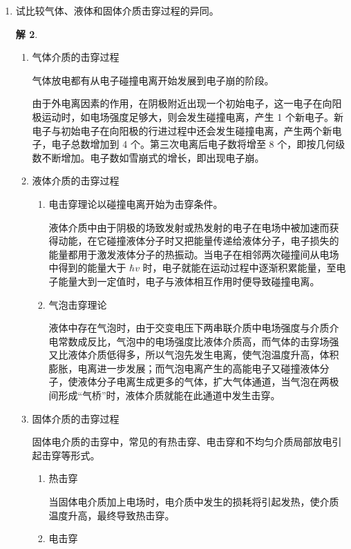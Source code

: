 \documentclass[zihao=-4,fontset = none]{ctexart}
\theoremstyle{definition}
\newtheorem*{solution}{解}
\begin{document}
\begin{enumerate}
\begin{solution}
\begin{enumerate}
      电压长时间作用，介质内温度变化极慢，热击穿临界电压为
      \( U_{OC}^2 = 8 \int_{T_0}^T \frac{K}{\gamma} \dd{T} \)。
    \end{enumerate}
  \end{solution}
  \item 试比较气体、液体和固体介质击穿过程的异同。
  \begin{solution}
    \begin{enumerate}
      \item 气体介质的击穿过程
      
      气体放电都有从电子碰撞电离开始发展到电子崩的阶段。

      由于外电离因素的作用，在阴极附近出现一个初始电子，这一电子在向阳极运动时，如电场强度足够大，则会发生碰撞电离，产生 1 个新电子。新电子与初始电子在向阳极的行进过程中还会发生碰撞电离，产生两个新电子，电子总数增加到 4 个。第三次电离后电子数将增至 8 个，即按几何级数不断增加。电子数如雪崩式的增长，即出现电子崩。
      \item 液体介质的击穿过程
      \begin{enumerate}
        \item 电击穿理论以碰撞电离开始为击穿条件。
        
        液体介质中由于阴极的场致发射或热发射的电子在电场中被加速而获得动能，在它碰撞液体分子时又把能量传递给液体分子，电子损失的能量都用于激发液体分子的热振动。当电子在相邻两次碰撞间从电场中得到的能量大于 $\hbar v$ 时，电子就能在运动过程中逐渐积累能量，至电子能量大到一定值时，电子与液体相互作用时便导致碰撞电离。
        \item 气泡击穿理论
        
        液体中存在气泡时，由于交变电压下两串联介质中电场强度与介质介电常数成反比，气泡中的电场强度比液体介质高，而气体的击穿场强又比液体介质低得多，所以气泡先发生电离，使气泡温度升高，体积膨胀，电离进一步发展；而气泡电离产生的高能电子又碰撞液体分子，使液体分子电离生成更多的气体，扩大气体通道，当气泡在两极间形成“气桥”时，液体介质就能在此通道中发生击穿。
      \end{enumerate}
      \item 固体介质的击穿过程
      
      固体电介质的击穿中，常见的有热击穿、电击穿和不均匀介质局部放电引起击穿等形式。
      \begin{enumerate}
        \item 热击穿
        
        当固体电介质加上电场时，电介质中发生的损耗将引起发热，使介质温度升高，最终导致热击穿。
        \item 电击穿
        

\end{enumerate}
\end{enumerate}
\end{solution}
\end{enumerate}
\end{document}
